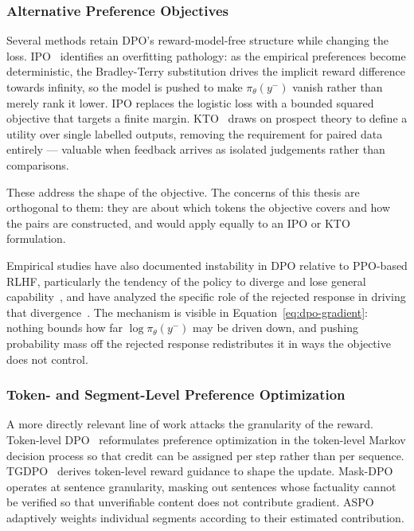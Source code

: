 \subsubsection{Alternative Preference Objectives}

Several methods retain DPO's reward-model-free structure while changing the loss. IPO~\cite{azar2024general} identifies an overfitting pathology: as the empirical preferences become deterministic, the Bradley-Terry substitution drives the implicit reward difference towards infinity, so the model is pushed to make $\pi_\theta(y^-)$ vanish rather than merely rank it lower. IPO replaces the logistic loss with a bounded squared objective that targets a finite margin. KTO~\cite{ethayarajh2023kto} draws on prospect theory to define a utility over single labelled outputs, removing the requirement for paired data entirely --- valuable when feedback arrives as isolated judgements rather than comparisons.

These address the shape of the objective. The concerns of this thesis are orthogonal to them: they are about which tokens the objective covers and how the pairs are constructed, and would apply equally to an IPO or KTO formulation.

Empirical studies have also documented instability in DPO relative to PPO-based RLHF, particularly the tendency of the policy to diverge and lose general capability~\cite{xu2024dpo, yan20243d}, and have analyzed the specific role of the rejected response in driving that divergence~\cite{cho2025rethinking}. The mechanism is visible in Equation~\ref{eq:dpo-gradient}: nothing bounds how far $\log \pi_\theta(y^-)$ may be driven down, and pushing probability mass off the rejected response redistributes it in ways the objective does not control.

\subsubsection{Token- and Segment-Level Preference Optimization}

A more directly relevant line of work attacks the granularity of the reward. Token-level DPO~\cite{zeng2024token} reformulates preference optimization in the token-level Markov decision process so that credit can be assigned per step rather than per sequence. TGDPO~\cite{zhu2025tgdpo} derives token-level reward guidance to shape the update. Mask-DPO~\cite{gu2025mask} operates at sentence granularity, masking out sentences whose factuality cannot be verified so that unverifiable content does not contribute gradient. ASPO~\cite{wang2025aspo} adaptively weights individual segments according to their estimated contribution.

